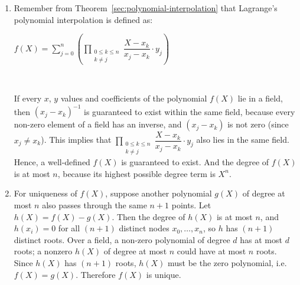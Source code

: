 \begin{myproof}
\begin{enumerate}

\item Remember from Theorem~\ref*{sec:polynomial-interpolation} that Lagrange's polynomial interpolation is defined as: 

$f(X) = \sum\limits_{j=0}^{n} \left( \prod\limits_{\substack{0 \le k \le n\\ k \ne j}} \dfrac{X - x_k}{x_j - x_k} \cdot y_j\right)$

$ $

If every $x$, $y$ values and coefficients of the polynomial $f(X)$ lie in a field, then $(x_j - x_k)^{-1}$ is guaranteed to exist within the same field, because every non-zero element of a field has an inverse, and $(x_j - x_k)$ is not zero (since $x_j \neq x_k$). This implies that $\prod\limits_{\substack{0 \le k \le n\\ k \ne j}} \dfrac{X - x_k}{x_j - x_k} \cdot y_j$ also lies in the same field. Hence, a well-defined $f(X)$ is guaranteed to exist. And the degree of $f(X)$ is at most $n$, because its highest possible degree term is $X^{n}$.

\item For uniqueness of $f(X)$, suppose another polynomial $g(X)$ of degree at most $n$ also passes through the same $n+1$ points. Let $h(X) = f(X) - g(X)$. Then the degree of $h(X)$ is at most $n$, and $h(x_i) = 0$ for all $(n+1)$ distinct nodes $x_0,\dots,x_{n}$, so $h$ has $(n+1)$ distinct roots. Over a field, a non-zero polynomial of degree $d$ has at most $d$ roots; a nonzero $h(X)$ of degree at most $n$ could have at most $n$ roots. Since $h(X)$ has $(n+1)$ roots, $h(X)$ must be the zero polynomial, i.e. $f(X) = g(X)$. Therefore $f(X)$ is unique.


\end{enumerate}
\end{myproof}